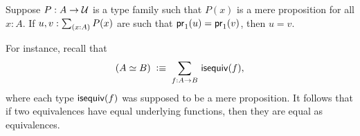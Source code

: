 \documentclass[hott-all.tex]{subfiles}
\begin{document}
\begin{lem}
  Suppose $P:A\to\mathcal{U}$ is a type family such that $P(x)$ is a mere proposition for all $x:A$.
  If $u,v:\sm{x:A} P(x)$ are such that $\mathsf{pr}_{1}(u) = \mathsf{pr}_{1}(v)$, then $u=v$.
\end{lem}
%
For instance, recall that %
\[(\eqv A B) \;\defeq\; \sm{f:A\to B} \isequiv (f),\]
where each type $\mathsf{isequiv} (f)$ was supposed to be a mere proposition.
It follows that if two equivalences have equal underlying functions, then they are equal as equivalences.
\end{document}
